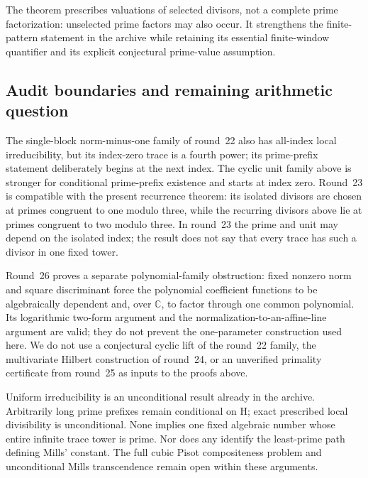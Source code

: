 \documentclass[11pt,a4paper]{article}
\theoremstyle{remark}\newtheorem{remark}[theorem]{Remark}
\begin{document}
The theorem prescribes valuations of selected divisors, not a complete
prime factorization: unselected prime factors may also occur. It
strengthens the finite-pattern statement in the archive while retaining
its essential finite-window quantifier and its explicit conjectural
prime-value assumption.

\subsection{Audit boundaries and remaining arithmetic question}
The single-block norm-minus-one family of round~22 also has all-index
local irreducibility, but its index-zero trace is a fourth power; its
prime-prefix statement deliberately begins at the next index. The
cyclic unit family above is stronger for conditional prime-prefix
existence and starts at index zero. Round~23 is compatible with the
present recurrence theorem: its isolated divisors are chosen at primes
congruent to one modulo three, while the recurring divisors above lie
at primes congruent to two modulo three. In round~23 the prime and unit
may depend on the isolated index; the result does not say that every
trace has such a divisor in one fixed tower.

Round~26 proves a separate polynomial-family obstruction: fixed nonzero
norm and square discriminant force the polynomial coefficient functions
to be algebraically dependent and, over $\mathbb C$, to factor through
one common polynomial. Its logarithmic two-form argument and the
normalization-to-an-affine-line argument are valid; they do not prevent
the one-parameter construction used here. We do not use a conjectural
cyclic lift of the round~22 family, the multivariate Hilbert construction
of round~24, or an unverified primality certificate from round~25 as
inputs to the proofs above.

Uniform irreducibility is an unconditional result already in the
archive. Arbitrarily long prime prefixes remain conditional on H;
exact prescribed local divisibility is unconditional. None implies
one fixed algebraic number whose entire infinite trace tower is prime.
Nor does any identify the least-prime path defining Mills' constant.
The full cubic Pisot compositeness problem and unconditional Mills
transcendence remain open within these arguments.

\end{document}
